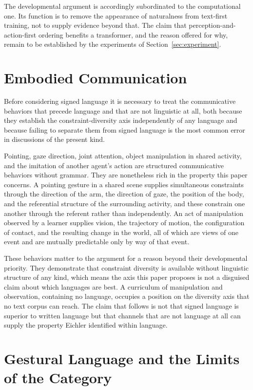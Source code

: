 \documentclass[11pt]{article}
\begin{document}
The developmental argument is accordingly subordinated to the computational one. Its function is to remove the appearance of naturalness from text-first training, not to supply evidence beyond that. The claim that perception-and-action-first ordering benefits a transformer, and the reason offered for why, remain to be established by the experiments of Section~\ref{sec:experiment}.


\section{Embodied Communication}
\label{sec:embodied}

Before considering signed language it is necessary to treat the communicative behaviors that precede language and that are not linguistic at all, both because they establish the constraint-diversity axis independently of any language and because failing to separate them from signed language is the most common error in discussions of the present kind.

Pointing, gaze direction, joint attention, object manipulation in shared activity, and the imitation of another agent's action are structured communicative behaviors without grammar. They are nonetheless rich in the property this paper concerns. A pointing gesture in a shared scene supplies simultaneous constraints through the direction of the arm, the direction of gaze, the position of the body, and the referential structure of the surrounding activity, and these constrain one another through the referent rather than independently. An act of manipulation observed by a learner supplies vision, the trajectory of motion, the configuration of contact, and the resulting change in the world, all of which are views of one event and are mutually predictable only by way of that event.

These behaviors matter to the argument for a reason beyond their developmental priority. They demonstrate that constraint diversity is available without linguistic structure of any kind, which means the axis this paper proposes is not a disguised claim about which languages are best. A curriculum of manipulation and observation, containing no language, occupies a position on the diversity axis that no text corpus can reach. The claim that follows is not that signed language is superior to written language but that channels that are not language at all can supply the property Eichler identified within language.

\section{Gestural Language and the Limits of the Category}
\label{sec:gestural}
\end{document}
